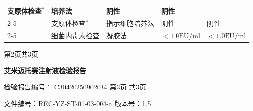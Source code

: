 \documentclass[UTF8,10pt,a4paper,fontset=fandol]{ctexart}
\newcommand{\fieldvalue}[1]{#1}
\begin{document}
\begin{tabularx}{\textwidth}{|p{2.2cm}|p{3.0cm}|p{2.7cm}|X|X|}
\fieldvalue{支原体检查$^{*}$}
&
\fieldvalue{培养法}
&
\fieldvalue{阴性}
&
\fieldvalue{阴性}
\\ \cline{2-5}
&
\fieldvalue{支原体检查$^{*}$}
&
\fieldvalue{指示细胞培养法}
&
\fieldvalue{阴性}
&
\fieldvalue{阴性}
\\ \cline{2-5}
&
\fieldvalue{细菌内毒素检查}
&
\fieldvalue{凝胶法}
&
\fieldvalue{$<1.0\mathrm{EU}/\mathrm{ml}$}
&
\fieldvalue{$<1.0\mathrm{EU}/\mathrm{ml}$}
\\ \hline
\end{tabularx}
\normalsize

\begin{center}
第2页共3页
\end{center}


\newpage

\begin{center}
\textbf{艾米迈托赛注射液检验报告}

检验报告编号：
\fieldvalue{\underline{C30420250902034}} \quad 第3页 共3页
\end{center}

\noindent
文件编号：REC-YZ-ST-01-03-004-a \qquad 版本号：1.5
\end{document}
